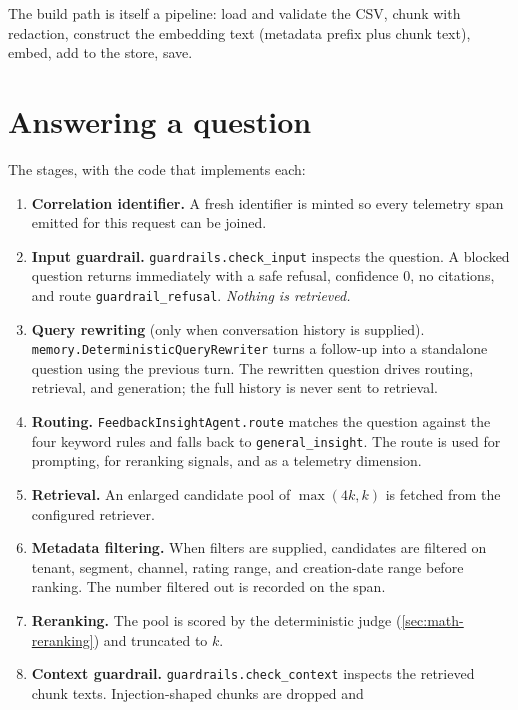The build path is itself a pipeline: load and validate the CSV, chunk with
redaction, construct the embedding text (metadata prefix plus chunk text),
embed, add to the store, save.

\section{Answering a question}
\label{sec:runtime-stages}



The stages, with the code that implements each:

\begin{enumerate}
  \item \textbf{Correlation identifier.} A fresh identifier is minted so every
    telemetry span emitted for this request can be joined.
  \item \textbf{Input guardrail.}
    \texttt{guardrails.check\_input} inspects the question. A blocked question
    returns immediately with a safe refusal, confidence $0$, no citations, and
    route \texttt{guardrail\_refusal}. \emph{Nothing is retrieved.}
  \item \textbf{Query rewriting} (only when conversation history is supplied).
    \texttt{memory.DeterministicQueryRewriter} turns a follow-up into a
    standalone question using the previous turn. The rewritten question drives
    routing, retrieval, and generation; the full history is never sent to
    retrieval.
  \item \textbf{Routing.} \texttt{FeedbackInsightAgent.route} matches the
    question against the four keyword rules and falls back to
    \texttt{general\_insight}. The route is used for prompting, for reranking
    signals, and as a telemetry dimension.
  \item \textbf{Retrieval.} An enlarged candidate pool of
    $\max(4k, k)$ is fetched from the configured retriever.
  \item \textbf{Metadata filtering.} When filters are supplied, candidates are
    filtered on tenant, segment, channel, rating range, and creation-date range
    before ranking. The number filtered out is recorded on the span.
  \item \textbf{Reranking.} The pool is scored by the deterministic judge
    (\cref{sec:math-reranking}) and truncated to $k$.
  \item \textbf{Context guardrail.} \texttt{guardrails.check\_context}
    inspects the retrieved chunk texts. Injection-shaped chunks are dropped and

\end{enumerate}
